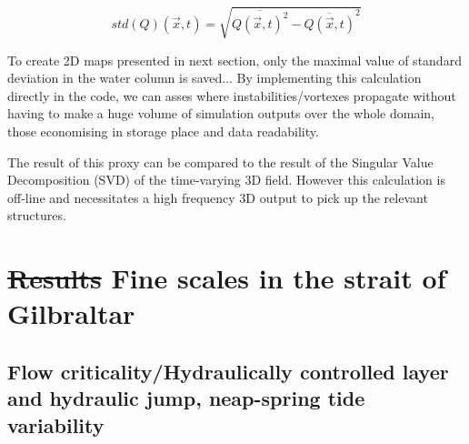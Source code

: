 \begin{equation} 
\label{eqstdQ} 
    std ( Q ) (\vec{x},t)=  \sqrt{   \overline{Q (\vec{x},t)^{2}} -  \overline{Q(\vec{x},t)}^{2}  }
\end{equation}

To create 2D maps presented in next section, only the maximal value of standard deviation in the water column is saved...
By implementing this calculation directly in the code, we can asses where instabilities/vortexes propagate without having to make a huge volume of simulation outputs over the whole domain, those economising in storage place and data readability. 

The result of this proxy can be compared to the result of the Singular Value Decomposition (SVD) of the time-varying 3D field. However this calculation is off-line and necessitates a high frequency 3D output to pick up the relevant structures.



\section{\sout{Results} Fine scales in the strait of Gilbraltar}
\label{section3DRes}

\subsection{Flow criticality/Hydraulically controlled layer and hydraulic jump, neap-spring tide variability}


